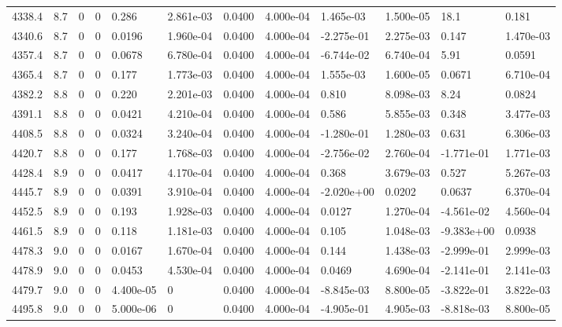 \documentclass[preview]{standalone}
\begin{document}
{{{{{{{{{{{\begin{tabular}{L{1.2cm}C{1.2cm} C{0.3cm}C{0.5cm} C{1.4cm}C{1.4cm} C{1.4cm}C{1.4cm} C{1.6cm}C{1.6cm} C{1.6cm}C{1.6cm}}
  4338.4  &   8.7  & 0     &  0 &  0.286  & 2.861e-03  &  0.0400&   4.000e-04& 1.465e-03 & 1.500e-05   &  18.1 & 0.181  \\ 
  4340.6  &   8.7  & 0     &  0 &  0.0196  & 1.960e-04  &  0.0400&   4.000e-04& -2.275e-01 & 2.275e-03   &  0.147 & 1.470e-03  \\ 
  4357.4  &   8.7  & 0     &  0 &  0.0678  & 6.780e-04  &  0.0400&   4.000e-04& -6.744e-02 & 6.740e-04   &  5.91 & 0.0591  \\ 
  4365.4  &   8.7  & 0     &  0 &  0.177  & 1.773e-03  &  0.0400&   4.000e-04& 1.555e-03 & 1.600e-05   &  0.0671 & 6.710e-04  \\ 
  4382.2  &   8.8  & 0     &  0 &  0.220  & 2.201e-03  &  0.0400&   4.000e-04& 0.810 & 8.098e-03   &  8.24 & 0.0824  \\ 
  4391.1  &   8.8  & 0     &  0 &  0.0421  & 4.210e-04  &  0.0400&   4.000e-04& 0.586 & 5.855e-03   &  0.348 & 3.477e-03  \\ 
  4408.5  &   8.8  & 0     &  0 &  0.0324  & 3.240e-04  &  0.0400&   4.000e-04& -1.280e-01 & 1.280e-03   &  0.631 & 6.306e-03  \\ 
  4420.7  &   8.8  & 0     &  0 &  0.177  & 1.768e-03  &  0.0400&   4.000e-04& -2.756e-02 & 2.760e-04   &  -1.771e-01 & 1.771e-03  \\ 
  4428.4  &   8.9  & 0     &  0 &  0.0417  & 4.170e-04  &  0.0400&   4.000e-04& 0.368 & 3.679e-03   &  0.527 & 5.267e-03  \\ 
  4445.7  &   8.9  & 0     &  0 &  0.0391  & 3.910e-04  &  0.0400&   4.000e-04& -2.020e+00 & 0.0202   &  0.0637 & 6.370e-04  \\ 
  4452.5  &   8.9  & 0     &  0 &  0.193  & 1.928e-03  &  0.0400&   4.000e-04& 0.0127 & 1.270e-04   &  -4.561e-02 & 4.560e-04  \\ 
  4461.5  &   8.9  & 0     &  0 &  0.118  & 1.181e-03  &  0.0400&   4.000e-04& 0.105 & 1.048e-03   &  -9.383e+00 & 0.0938  \\ 
  4478.3  &   9.0  & 0     &  0 &  0.0167  & 1.670e-04  &  0.0400&   4.000e-04& 0.144 & 1.438e-03   &  -2.999e-01 & 2.999e-03  \\ 
  4478.9  &   9.0  & 0     &  0 &  0.0453  & 4.530e-04  &  0.0400&   4.000e-04& 0.0469 & 4.690e-04   &  -2.141e-01 & 2.141e-03  \\ 
  4479.7  &   9.0  & 0     &  0 &  4.400e-05  & 0  &  0.0400&   4.000e-04& -8.845e-03 & 8.800e-05   &  -3.822e-01 & 3.822e-03  \\ 
  4495.8  &   9.0  & 0     &  0 &  5.000e-06  & 0  &  0.0400&   4.000e-04& -4.905e-01 & 4.905e-03   &  -8.818e-03 & 8.800e-05  \\ 

\end{tabular}}}}}}}}}}}}
\end{document}
